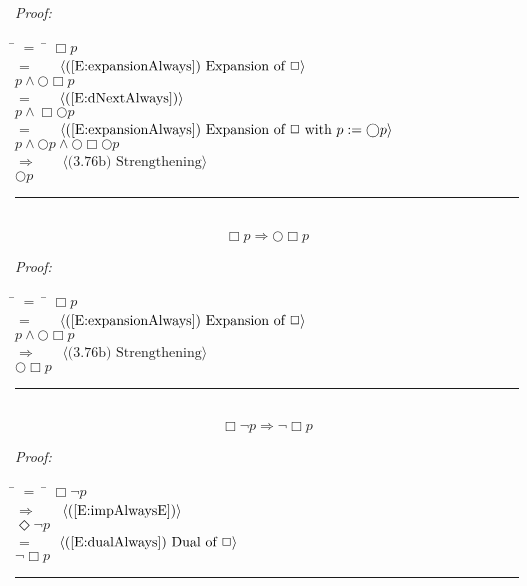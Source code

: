 \documentclass[fleqn, leqno]{article}
\newcommand{\lgap}{2pt}                             %
\newcommand{\mymathindent}{24pt}                      %
\newcommand{\Next}{\bigcirc}
\newcommand{\Event}{\Diamond}
\newcommand{\Always}{\Box}
\newcommand{\myqed}{\hfill\rule[-.23ex]{1.2ex}{2.0ex}}
\newcommand{\Gll} {\langle}                         %
\newcommand{\Ggg} {\rangle}                         %
\newcommand{\Hint}[1]     {\ \ \ $\Gll              \mbox{#1} \Ggg$ }   %
\begin{document}
\emph{Proof:}
\begin{tabbing}
\hspace{\mymathindent} \= $= \;$ \= \kill
  \> \>   $\Always p$\\[\lgap]
  \> $=$  \>  \Hint{(\ref{E:expansionAlways}) Expansion of $\Always$}\\[\lgap]
  \> \>   $p \land \Next\Always p$\\[\lgap]
  \> $=$  \>  \Hint{(\ref{E:dNextAlways})}\\[\lgap]
  \> \>   $p \land \Always\Next p$\\[\lgap]
  \> $=$  \>  \Hint{(\ref{E:expansionAlways}) Expansion of $\Always$ with $p := \Next p$}\\[\lgap]
  \> \>   $p \land \Next p \land \Next\Always\Next p$\\[\lgap]
  \> $\Rightarrow$  \>  \Hint{(3.76b) Strengthening}\\[\lgap]
  \> \>   $\Next p$\\[\lgap]
\end{tabbing}
\myqed\\[\lgap]


\begin{equation}\label{E:impAlwaysNA}
\Always p \Rightarrow \Next\Always p
\end{equation}

\emph{Proof:}
\begin{tabbing}
\hspace{\mymathindent} \= $= \;$ \= \kill
  \> \>   $\Always p$\\[\lgap]
  \> $=$  \>  \Hint{(\ref{E:expansionAlways}) Expansion of $\Always$}\\[\lgap]
  \> \>   $p \land \Next\Always p$\\[\lgap]
  \> $\Rightarrow$  \>  \Hint{(3.76b) Strengthening}\\[\lgap]
  \> \>   $\Next\Always p$\\[\lgap]
\end{tabbing}
\myqed\\[\lgap]


\begin{equation}\label{E:exAlwaysNot}
\Always\lnot p \Rightarrow \lnot\Always p
\end{equation}

\emph{Proof:}
\begin{tabbing}
\hspace{\mymathindent} \= $= \;$ \= \kill
  \> \>   $\Always\lnot p$\\[\lgap]
  \> $\Rightarrow$  \>  \Hint{(\ref{E:impAlwaysE})}\\[\lgap]
  \> \>   $\Event\lnot p$\\[\lgap]
  \> $=$  \>  \Hint{(\ref{E:dualAlways}) Dual of $\Always$}\\[\lgap]
  \> \>   $\lnot\Always p$\\[\lgap]
\end{tabbing}
\myqed\\[\lgap]
\end{document}
